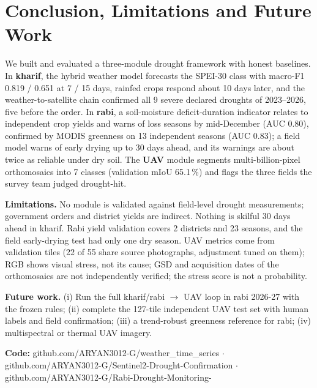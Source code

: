 \documentclass[11pt,a4paper,oneside]{article}
\newcommand{\mf}{macro-F1}
\begin{document}
\section{Conclusion, Limitations and Future Work}
We built and evaluated a three-module drought framework with honest baselines. In \textbf{kharif}, the hybrid weather model forecasts the SPEI-30 class with \mf{} 0.819 / 0.651 at 7 / 15 days, rainfed crops respond about 10 days later, and the weather-to-satellite chain confirmed all 9 severe declared droughts of 2023--2026, five before the order. In \textbf{rabi}, a soil-moisture deficit-duration indicator relates to independent crop yields and warns of loss seasons by mid-December (AUC 0.80), confirmed by MODIS greenness on 13 independent seasons (AUC 0.83); a field model warns of early drying up to 30 days ahead, and its warnings are about twice as reliable under dry soil. The \textbf{UAV} module segments multi-billion-pixel orthomosaics into 7 classes (validation mIoU 65.1\,\%) and flags the three fields the survey team judged drought-hit.

\textbf{Limitations.} No module is validated against field-level drought measurements; government orders and district yields are indirect. Nothing is skilful 30 days ahead in kharif. Rabi yield validation covers 2 districts and 23 seasons, and the field early-drying test had only one dry season. UAV metrics come from validation tiles (22 of 55 share source photographs, adjustment tuned on them); RGB shows visual stress, not its cause; GSD and acquisition dates of the orthomosaics are not independently verified; the stress score is not a probability.

\textbf{Future work.} (i) Run the full kharif/rabi $\rightarrow$ UAV loop in rabi 2026-27 with the frozen rules; (ii) complete the 127-tile independent UAV test set with human labels and field confirmation; (iii) a trend-robust greenness reference for rabi; (iv) multispectral or thermal UAV imagery.

\textbf{Code:} github.com/ARYAN3012-G/weather\_time\_series $\cdot$ github.com/ARYAN3012-G/Sentinel2-Drought-Confirmation $\cdot$ github.com/ARYAN3012-G/Rabi-Drought-Monitoring-

\end{document}
